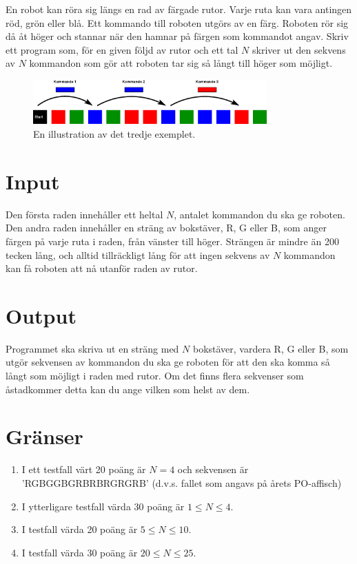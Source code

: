 
En robot kan röra sig längs en rad av färgade rutor. Varje ruta kan
vara antingen röd, grön eller blå. Ett kommando till roboten utgörs av
en färg. Roboten rör sig då åt höger och stannar när den hamnar på
färgen som kommandot angav. Skriv ett program som, för en given följd
av rutor och ett tal $N$ skriver ut den sekvens av $N$ kommandon som
gör att roboten tar sig så långt till höger som möjligt.

\begin{figure}[ht!]
\centering
\includegraphics[width=0.8\textwidth]{fargrobot.png}
\caption{En illustration av det tredje exemplet.}
\label{overflow}
\end{figure}


\section*{Input}
Den första raden innehåller ett heltal $N$, antalet kommandon du ska
ge roboten. Den andra raden innehåller en sträng av bokstäver, R, G eller B, som
anger färgen på varje ruta i raden, från vänster till höger. Strängen är mindre än
200 tecken lång, och alltid tillräckligt lång för att ingen sekvens
av $N$ kommandon kan få roboten att nå utanför raden av rutor.

\section*{Output}

Programmet ska skriva ut en sträng med $N$ bokstäver, vardera R, G
eller B, som utgör sekvensen av kommandon du ska ge roboten för att
den ska komma så långt som möjligt i raden med rutor. Om det finns
flera sekvenser som åstadkommer detta kan du ange vilken som helst av dem.

\section*{Gränser}

\begin{enumerate}
\item I ett testfall värt 20 poäng är $N=4$ och sekvensen är
  'RGBGGBGRBRBRGRGRB' (d.v.s. fallet som angavs på årets PO-affisch)
\item I ytterligare testfall värda 30 poäng är $1 \le N \le 4$.
\item I testfall värda 20 poäng är $5 \le N \le 10$. 
\item I testfall värda 30 poäng är $20 \le N \le 25$.
\end{enumerate}

